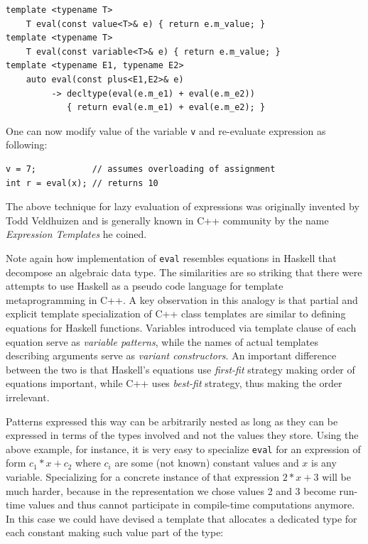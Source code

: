 \documentclass[preprint]{sigplanconf}
\makeatletter
\DeclareRobustCommand{\code}[1]{{\lstinline[breaklines=false,escapechar=@]{#1}}}
\makeatother
\begin{document}
\begin{lstlisting}[keepspaces,columns=flexible]
template <typename T> 
    T eval(const value<T>& e) { return e.m_value; }
template <typename T> 
    T eval(const variable<T>& e) { return e.m_value; }
template <typename E1, typename E2> 
    auto eval(const plus<E1,E2>& e) 
         -> decltype(eval(e.m_e1) + eval(e.m_e2))
            { return eval(e.m_e1) + eval(e.m_e2); }
\end{lstlisting}

\noindent One can now modify value of the variable \code{v} and re-evaluate 
expression as following:

\begin{lstlisting}
v = 7;           // assumes overloading of assignment
int r = eval(x); // returns 10
\end{lstlisting}

\noindent The above technique for lazy evaluation of expressions was originally 
invented by Todd Veldhuizen and is generally known in C++ community by the name 
\emph{Expression Templates} he coined\cite{Veldhuizen95expressiontemplates}. 

Note again how implementation of \code{eval} resembles equations in Haskell that 
decompose an algebraic data type. The similarities are so striking that there 
were attempts to use Haskell as a pseudo code language for template 
metaprogramming in C++\cite{Milewski11}. A key observation in this analogy is 
that partial and explicit template specialization of C++ class templates are 
similar to defining equations for Haskell functions. Variables introduced via 
template clause of each equation serve as \emph{variable patterns}, while the 
names of actual templates describing arguments serve as \emph{variant 
constructors}. An important difference between the two is that Haskell's 
equations use \emph{first-fit} strategy making order of equations important, 
while C++ uses \emph{best-fit} strategy, thus making the order irrelevant.

Patterns expressed this way can be arbitrarily nested as long as they can be 
expressed in terms of the types involved and not the values they store. Using 
the above example, for instance, it is very easy to specialize \code{eval} for 
an expression of form $c_1*x+c_2$ where $c_i$ are some (not known) constant 
values and $x$ is any variable. Specializing for a concrete instance of that 
expression $2*x+3$ will be much harder, because in the representation we chose 
values 2 and 3 become run-time values and thus cannot participate in 
compile-time computations anymore. In this case we could have devised a template 
that allocates a dedicated type for each constant making such value part of the 
type:
\end{document}
